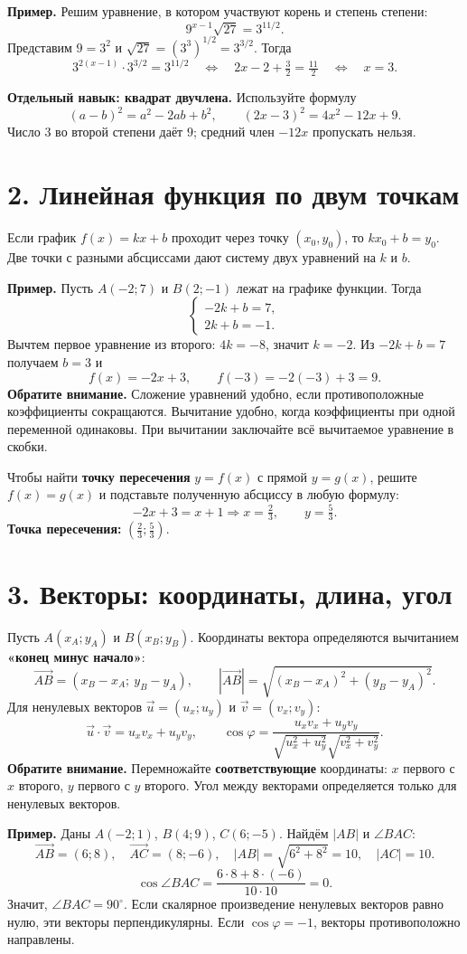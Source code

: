 \documentclass[a4paper,11pt]{article}
\newcommand{\secname}[1]{\section*{\color{darkaccent}#1}\vspace{-4pt}\color{black}}
\newcommand{\tip}[1]{\textcolor{darkaccent}{\textbf{Обратите внимание.}} #1}
\newcommand{\ex}[1]{\textcolor{darkaccent}{\textbf{Пример.}} #1}
\begin{document}
\ex{Решим уравнение, в котором участвуют корень и степень степени:}
\[
9^{x-1}\sqrt{27}=3^{11/2}.
\]
Представим $9=3^2$ и $\sqrt{27}=(3^3)^{1/2}=3^{3/2}$. Тогда
\[
3^{2(x-1)}\cdot 3^{3/2}=3^{11/2}
\quad\Longleftrightarrow\quad 2x-2+\tfrac32=\tfrac{11}{2}
\quad\Longleftrightarrow\quad x=3.
\]

\textbf{Отдельный навык: квадрат двучлена.} Используйте формулу
\[
(a-b)^2=a^2-2ab+b^2,
\qquad (2x-3)^2=4x^2-12x+9.
\]
Число $3$ во второй степени даёт $9$; средний член $-12x$ пропускать нельзя.

\secname{2. Линейная функция по двум точкам}
Если график $f(x)=kx+b$ проходит через точку $(x_0,y_0)$, то $kx_0+b=y_0$. Две точки с разными абсциссами дают систему двух уравнений на $k$ и $b$.

\ex{Пусть $A(-2;7)$ и $B(2;-1)$ лежат на графике функции.} Тогда
\[
\begin{cases}-2k+b=7,\\2k+b=-1.\end{cases}
\]
Вычтем первое уравнение из второго: $4k=-8$, значит $k=-2$. Из $-2k+b=7$ получаем $b=3$ и
\[
\boxed{f(x)=-2x+3},\qquad f(-3)=-2(-3)+3=9.
\]
\tip{Сложение уравнений удобно, если противоположные коэффициенты сокращаются. Вычитание удобно, когда коэффициенты при одной переменной одинаковы. При вычитании заключайте всё вычитаемое уравнение в скобки.}

Чтобы найти \textbf{точку пересечения} $y=f(x)$ с прямой $y=g(x)$, решите $f(x)=g(x)$ и подставьте полученную абсциссу в любую формулу:
\[
-2x+3=x+1\Longrightarrow x=\tfrac23,\qquad y=\tfrac53.
\]
\textbf{Точка пересечения:} $\left(\frac23;\frac53\right)$.
\secname{3. Векторы: координаты, длина, угол}
Пусть $A(x_A;y_A)$ и $B(x_B;y_B)$. Координаты вектора определяются вычитанием \textbf{«конец минус начало»}:
\[
\overrightarrow{AB}=(x_B-x_A;\ y_B-y_A),\qquad
|\overrightarrow{AB}|=\sqrt{(x_B-x_A)^2+(y_B-y_A)^2}.
\]
Для ненулевых векторов $\vec u=(u_x;u_y)$ и $\vec v=(v_x;v_y)$:
\[
\vec u\cdot\vec v=u_xv_x+u_yv_y,
\qquad \cos\varphi=\frac{u_xv_x+u_yv_y}{\sqrt{u_x^2+u_y^2}\sqrt{v_x^2+v_y^2}}.
\]
\tip{Перемножайте \textbf{соответствующие} координаты: $x$ первого с $x$ второго, $y$ первого с $y$ второго. Угол между векторами определяется только для ненулевых векторов.}

\ex{Даны $A(-2;1)$, $B(4;9)$, $C(6;-5)$. Найдём $|AB|$ и $\angle BAC$:}
\[
\overrightarrow{AB}=(6;8),\quad \overrightarrow{AC}=(8;-6),\quad
|AB|=\sqrt{6^2+8^2}=10,\quad |AC|=10.
\]
\[
\cos\angle BAC=\frac{6\cdot8+8\cdot(-6)}{10\cdot10}=0.
\]
Значит, $\boxed{\angle BAC=90^\circ}$. Если скалярное произведение ненулевых векторов равно нулю, эти векторы перпендикулярны. Если $\cos\varphi=-1$, векторы противоположно направлены.
\end{document}
